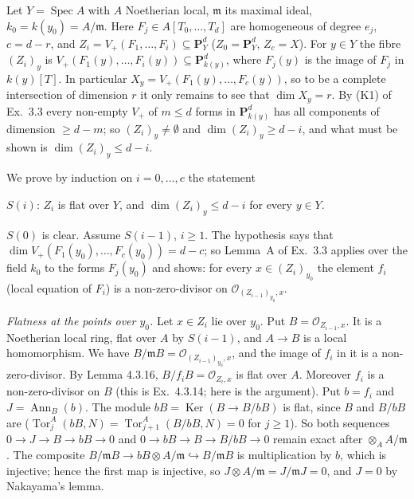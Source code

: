 \documentclass[11pt]{article}
\begin{document}
\pf
Let $Y=\operatorname{Spec}A$ with $A$ Noetherian local, $\mathfrak m$ its maximal ideal, $k_0=k(y_0)=A/\mathfrak m$. Here $F_j\in A[T_0,\dots,T_d]$ are homogeneous of degree $e_j$, $c=d-r$, and $Z_i=V_+(F_1,\dots,F_i)\subseteq\mathbf P^d_Y$ ($Z_0=\mathbf P^d_Y$, $Z_c=X$). For $y\in Y$ the fibre $(Z_i)_y$ is $V_+(F_1(y),\dots,F_i(y))\subseteq\mathbf P^d_{k(y)}$, where $F_j(y)$ is the image of $F_j$ in $k(y)[T]$. In particular $X_y=V_+(F_1(y),\dots,F_c(y))$, so to be a complete intersection of dimension $r$ it only remains to see that $\dim X_y=r$. By (K1) of Ex.~3.3 every non-empty $V_+$ of $m\le d$ forms in $\mathbf P^d_{k(y)}$ has all components of dimension $\ge d-m$; so $(Z_i)_y\ne\emptyset$ and $\dim(Z_i)_y\ge d-i$, and what must be shown is $\dim(Z_i)_y\le d-i$.

We prove by induction on $i=0,\dots,c$ the statement

$S(i)$: $Z_i$ is flat over $Y$, and $\dim(Z_i)_y\le d-i$ for every $y\in Y$.

$S(0)$ is clear. Assume $S(i-1)$, $i\ge1$. The hypothesis says that $\dim V_+(F_1(y_0),\dots,F_c(y_0))=d-c$; so Lemma~A of Ex.~3.3 applies over the field $k_0$ to the forms $F_j(y_0)$ and shows: for every $x\in(Z_i)_{y_0}$ the element $f_i$ (local equation of $F_i$) is a non-zero-divisor on $\mathcal O_{(Z_{i-1})_{y_0},x}$.

\emph{Flatness at the points over $y_0$.} Let $x\in Z_i$ lie over $y_0$. Put $B=\mathcal O_{Z_{i-1},x}$. It is a Noetherian local ring, flat over $A$ by $S(i-1)$, and $A\to B$ is a local homomorphism. We have $B/\mathfrak mB=\mathcal O_{(Z_{i-1})_{y_0},x}$, and the image of $f_i$ in it is a non-zero-divisor. By Lemma 4.3.16, $B/f_iB=\mathcal O_{Z_i,x}$ is flat over $A$. Moreover $f_i$ is a non-zero-divisor on $B$ (this is Ex.~4.3.14; here is the argument). Put $b=f_i$ and $J=\operatorname{Ann}_B(b)$. The module $bB=\operatorname{Ker}(B\to B/bB)$ is flat, since $B$ and $B/bB$ are ($\operatorname{Tor}_j^A(bB,N)=\operatorname{Tor}_{j+1}^A(B/bB,N)=0$ for $j\ge1$). So both sequences $0\to J\to B\to bB\to0$ and $0\to bB\to B\to B/bB\to0$ remain exact after $\otimes_AA/\mathfrak m$. The composite $B/\mathfrak mB\to bB\otimes A/\mathfrak m\hookrightarrow B/\mathfrak mB$ is multiplication by $b$, which is injective; hence the first map is injective, so $J\otimes A/\mathfrak m=J/\mathfrak mJ=0$, and $J=0$ by Nakayama's lemma.
\end{document}
